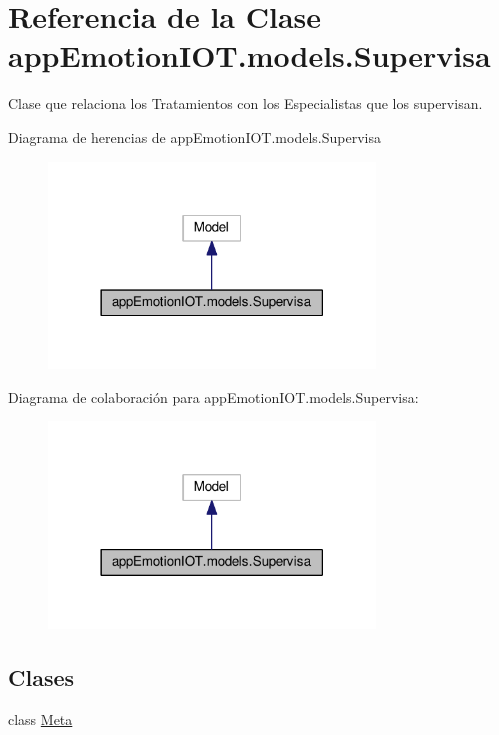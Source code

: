 \hypertarget{classappEmotionIOT_1_1models_1_1Supervisa}{}\section{Referencia de la Clase app\+Emotion\+I\+O\+T.\+models.\+Supervisa}
\label{classappEmotionIOT_1_1models_1_1Supervisa}


Clase que relaciona los Tratamientos con los Especialistas que los supervisan.  




Diagrama de herencias de app\+Emotion\+I\+O\+T.\+models.\+Supervisa
\nopagebreak
\begin{figure}[H]
\begin{center}
\leavevmode
\includegraphics[width=246pt]{classappEmotionIOT_1_1models_1_1Supervisa__inherit__graph}
\end{center}
\end{figure}


Diagrama de colaboración para app\+Emotion\+I\+O\+T.\+models.\+Supervisa\+:
\nopagebreak
\begin{figure}[H]
\begin{center}
\leavevmode
\includegraphics[width=246pt]{classappEmotionIOT_1_1models_1_1Supervisa__coll__graph}
\end{center}
\end{figure}
\subsection*{Clases}
\begin{DoxyCompactItemize}
\item 
class \hyperlink{classappEmotionIOT_1_1models_1_1Supervisa_1_1Meta}{Meta}
\end{DoxyCompactItemize}
